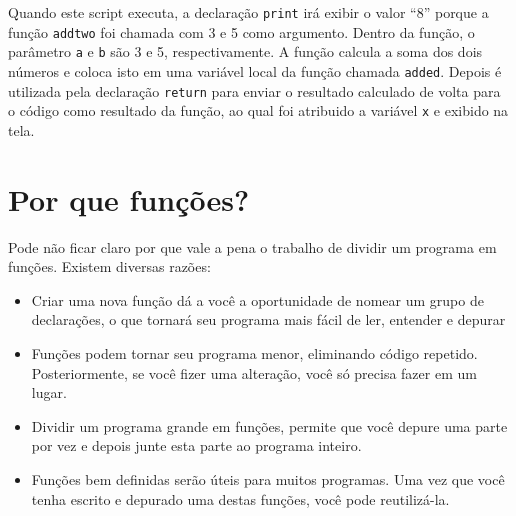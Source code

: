 Quando este script executa, a declaração {\tt print} irá exibir o valor ``8''
porque a função {\tt addtwo} foi chamada com 3 e 5 como argumento. Dentro da
função, o parâmetro {\tt a} e {\tt b} são 3 e 5, respectivamente. A função
calcula a soma dos dois números e coloca isto em uma variável local da função
chamada {\tt added}. Depois é utilizada pela declaração {\tt return} para
enviar o resultado calculado de volta para o código como resultado da função, ao qual
foi atribuido a variável {\tt x} e exibido na tela.

\section{Por que funções?}


Pode não ficar claro por que vale a pena o trabalho de dividir um programa
em funções. Existem diversas razões:

\begin{itemize}


\item Criar uma nova função dá a você a oportunidade de nomear um grupo de
declarações, o que tornará seu programa mais fácil de ler, entender e
depurar


\item Funções podem tornar seu programa menor, eliminando código repetido.
Posteriormente, se você fizer uma alteração, você só precisa fazer em um
lugar.


\item Dividir um programa grande em funções, permite que você depure uma
parte por vez e depois junte esta parte ao programa inteiro.


\item Funções bem definidas serão úteis para muitos programas. Uma vez que
você tenha escrito e depurado uma destas funções, você pode reutilizá-la.
\end{itemize}

